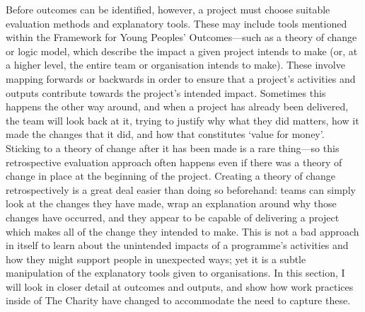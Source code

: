 Before outcomes can be identified, however, a project must choose suitable evaluation methods and explanatory tools. These may include tools mentioned within the Framework for Young Peoples' Outcomes—such as a theory of change or logic model, which describe the impact a given project intends to make (or, at a higher level, the entire team or organisation intends to make). These involve mapping forwards or backwards in order to ensure that a project's activities and outputs contribute towards the project's intended impact. Sometimes this happens the other way around, and when a project has already been delivered, the team will look back at it, trying to justify why what they did matters, how it made the changes that it did, and how that constitutes `value for money'. Sticking to a theory of change after it has been made is a rare thing—so this retrospective evaluation approach often happens even if there was a theory of change in place at the beginning of the project. Creating a theory of change retrospectively is a great deal easier than doing so beforehand: teams can simply look at the changes they have made, wrap an explanation around why those changes have occurred, and they appear to be capable of delivering a project which makes all of the change they intended to make. This is not a bad approach in itself to learn about the unintended impacts of a programme's activities and how they might support people in unexpected ways; yet it is a subtle manipulation of the explanatory tools given to organisations. In this section, I will look in closer detail at outcomes and outputs, and show how work practices inside of The Charity have changed to accommodate the need to capture these.

